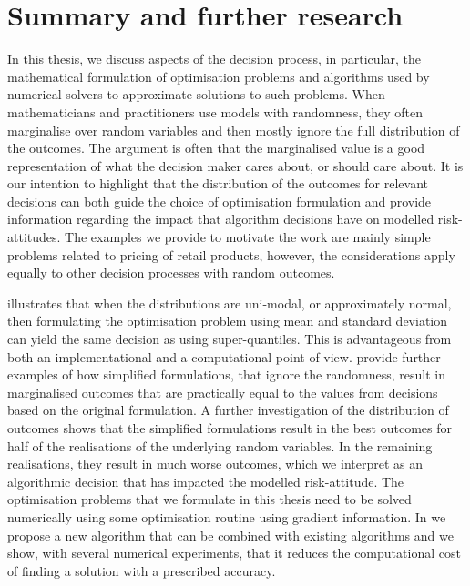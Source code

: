 \documentclass[main.tex]{subfiles}
\begin{document}
\chapter{Summary and further research}\label{ch:conclusion}

In this thesis, we discuss aspects of the decision process, in
particular, the mathematical formulation of optimisation problems and
algorithms used by numerical solvers to approximate solutions to such
problems.  When mathematicians and practitioners use models with
randomness, they often marginalise over random variables and then
mostly ignore the full distribution of the outcomes. The argument is
often that the marginalised value is a good representation of what the
decision maker cares about, or should care about.  It is our intention
to highlight that the distribution of the outcomes for
relevant decisions can both guide the choice of optimisation
formulation and provide information regarding the impact that algorithm
decisions have on modelled risk-attitudes.  The examples we provide to
motivate the work are mainly simple problems related to pricing of retail
products, however, the considerations apply equally to other decision
processes with random outcomes.

 illustrates that when the distributions are
uni-modal, or approximately normal, then formulating the optimisation
problem using mean and standard deviation can yield the same decision
as using super-quantiles. This is advantageous from both an
implementational and a computational point of view.
 provide further examples of
how simplified formulations, that ignore the randomness, result in
marginalised outcomes that are practically equal to the values from
decisions based on the original formulation. A further investigation
of the distribution of outcomes shows that the simplified formulations
result in the best outcomes for half of the realisations of the
underlying random variables. In the remaining realisations, they
result in much worse outcomes, which we interpret as an algorithmic
decision that has impacted the modelled risk-attitude.  The
optimisation problems that we formulate in this thesis need to be
solved numerically using some optimisation routine using gradient
information. In  we propose a new algorithm that can
be combined with existing algorithms and we show, with several
numerical experiments, that it reduces the computational cost of
finding a solution with a prescribed accuracy.
\end{document}
